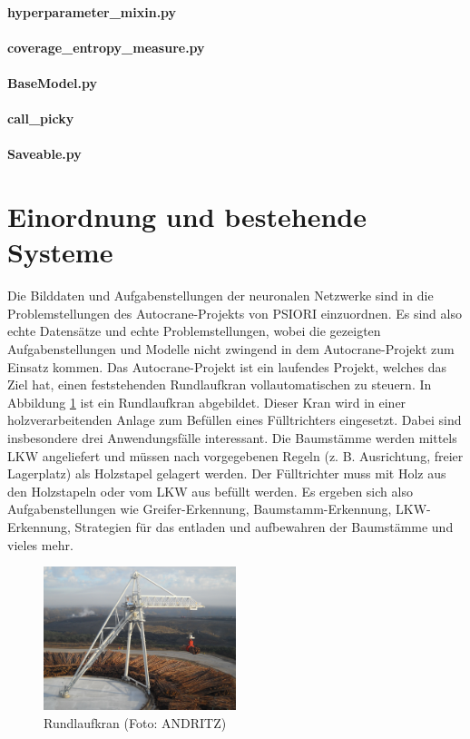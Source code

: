 	\paragraph{hyperparameter\_mixin.py}  
	\paragraph{coverage\_entropy\_measure.py} 
	\paragraph{BaseModel.py} 
	\paragraph{call\_picky}
	\paragraph{Saveable.py} 
		
	\section{Einordnung und bestehende Systeme}
	\label{sec:BestehendesSystem}
	Die Bilddaten und Aufgabenstellungen der neuronalen Netzwerke sind in die Problemstellungen des Autocrane-Projekts von PSIORI einzuordnen. Es sind also echte Datensätze und echte Problemstellungen, wobei die gezeigten Aufgabenstellungen und Modelle nicht zwingend in dem Autocrane-Projekt zum Einsatz kommen. Das Autocrane-Projekt ist ein laufendes Projekt, welches das Ziel hat, einen feststehenden Rundlaufkran vollautomatischen zu steuern. In Abbildung \ref{img:CircularCrane} ist ein Rundlaufkran abgebildet. Dieser Kran wird in einer holzverarbeitenden Anlage zum Befüllen eines Fülltrichters eingesetzt. Dabei sind insbesondere drei Anwendungsfälle interessant. Die Baumstämme werden mittels LKW angeliefert und müssen nach vorgegebenen Regeln (z. B. Ausrichtung, freier Lagerplatz) als Holzstapel gelagert werden. Der Fülltrichter muss mit Holz aus den Holzstapeln oder vom LKW aus befüllt werden. Es ergeben sich also Aufgabenstellungen wie Greifer-Erkennung, Baumstamm-Erkennung, LKW-Erkennung, Strategien für das entladen und aufbewahren der Baumstämme und vieles mehr. \cite{PSIORIGmbH.2019}
	\begin{figure}[h]
		\centering
		\includegraphics[width=0.5\textwidth, center]{bilder/Grundlagen/Kran_vollstaendig_N1_030.jpg}
		\caption[Rund-Kran]{Rundlaufkran (Foto: ANDRITZ)}
		\label{img:CircularCrane}
	\end{figure}		

